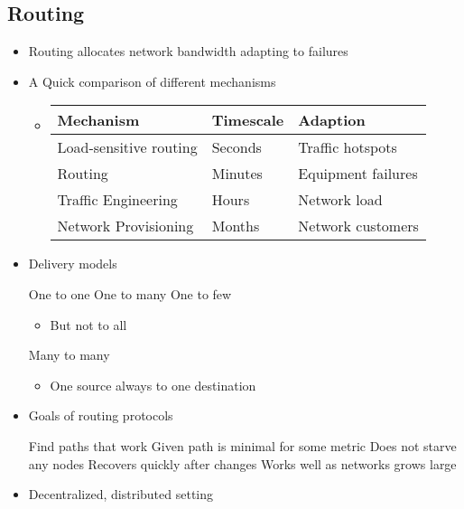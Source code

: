 \subsection{Routing}
\begin{itemize}
    \item Routing allocates network bandwidth adapting to failures
    \item A Quick comparison of different mechanisms
        \begin{itemize}
            \item
\begin{tabular}{| l | l | l}
    Mechanism & Timescale & Adaption\\\hline
    Load-sensitive routing & Seconds & Traffic hotspots\\
    Routing & Minutes & Equipment failures\\
    Traffic Engineering & Hours & Network load\\
    Network Provisioning & Months & Network customers
\end{tabular}
        \end{itemize}
    \item Delivery models
        \begin{itemize}
             One to one
             One to many
             One to few
                \begin{itemize}
                    \item But not to all
                \end{itemize}
             Many to many
                \begin{itemize}
                    \item One source always to one destination
                \end{itemize}
        \end{itemize}
    \item Goals of routing protocols
        \begin{itemize}
             Find paths that work
             Given path is minimal for some metric
             Does not starve any nodes
             Recovers quickly after changes
             Works well as networks grows large
        \end{itemize}
    \item Decentralized, distributed setting
        \begin{itemize}

\end{itemize}
\end{itemize}
